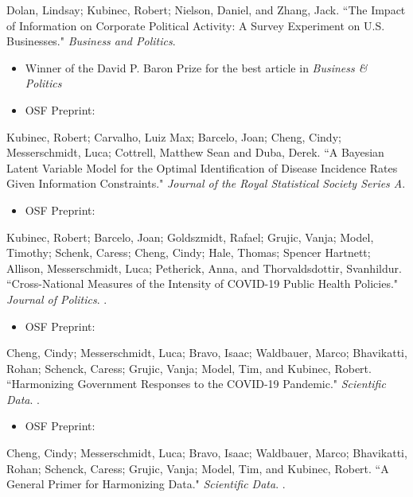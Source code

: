 \documentclass[11pt, a4paper]{article}
\newcommand{\years}[1]{\ifvmode\needspace{3\baselineskip}\fi\marginnote{\scriptsize #1}}
\begin{document}
\years{2025} Dolan, Lindsay; Kubinec, Robert; Nielson, Daniel, and Zhang, Jack. ``The Impact of Information on Corporate Political Activity: A Survey Experiment on U.S. Businesses." \emph{Business and Politics}. 

\begin{itemize}
	\item Winner of the David P. Baron Prize for the best article in \emph{Business \& Politics}
	\item OSF Preprint: 
\end{itemize}

\years{2025} Kubinec, Robert; Carvalho, Luiz Max; Barcelo, Joan; Cheng, Cindy; Messerschmidt, Luca; Cottrell, Matthew Sean and Duba, Derek. ``A Bayesian Latent Variable Model for the Optimal Identification of Disease Incidence Rates Given Information Constraints." \emph{Journal of the Royal Statistical Society Series A}. 

\begin{itemize}
	\item OSF Preprint: 
\end{itemize}

\years{2024} Kubinec, Robert; Barcelo, Joan; Goldszmidt, Rafael; Grujic, Vanja; Model, Timothy; Schenk, Caress; Cheng, Cindy; Hale, Thomas; Spencer Hartnett; Allison, Messerschmidt, Luca; Petherick, Anna, and Thorvaldsdottir, Svanhildur. ``Cross-National Measures of the Intensity of COVID-19 Public Health Policies." \emph{Journal of Politics}. .

\begin{itemize}
	\item OSF Preprint: 
\end{itemize}

\years{2024} Cheng, Cindy; Messerschmidt, Luca; Bravo, Isaac; Waldbauer, Marco; Bhavikatti, Rohan; Schenck, Caress; Grujic, Vanja; Model, Tim, and Kubinec, Robert. ``Harmonizing Government Responses to the COVID-19 Pandemic." \emph{Scientific Data}. .

\begin{itemize}
	\item OSF Preprint: 
\end{itemize}

\years{2023} Cheng, Cindy; Messerschmidt, Luca; Bravo, Isaac; Waldbauer, Marco; Bhavikatti, Rohan; Schenck, Caress; Grujic, Vanja; Model, Tim, and Kubinec, Robert. ``A General Primer for Harmonizing Data." \emph{Scientific Data}. .
\end{document}
